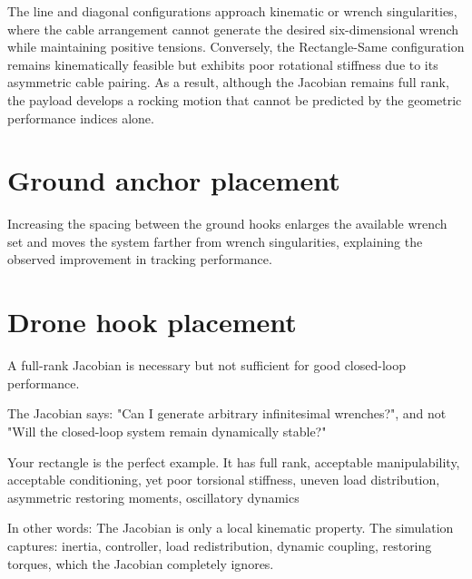 
The line and diagonal configurations approach kinematic or wrench singularities, where the cable arrangement cannot generate the desired six-dimensional wrench while maintaining positive tensions. Conversely, the Rectangle-Same configuration remains kinematically feasible but exhibits poor rotational stiffness due to its asymmetric cable pairing. As a result, although the Jacobian remains full rank, the payload develops a rocking motion that cannot be predicted by the geometric performance indices alone.





\section{Ground anchor placement}
Increasing the spacing between the ground hooks enlarges the available wrench set and moves the system farther from wrench singularities, explaining the observed improvement in tracking performance.

\section{Drone hook placement}
\label{sec:dronehook}



A full-rank Jacobian is necessary but not sufficient for good closed-loop performance.

The Jacobian says: "Can I generate arbitrary infinitesimal wrenches?", and not "Will the closed-loop system remain dynamically stable?"

Your rectangle is the perfect example. It has full rank, acceptable manipulability, acceptable conditioning, yet poor torsional stiffness, uneven load distribution, asymmetric restoring moments, oscillatory dynamics

In other words: The Jacobian is only a local kinematic property. The simulation captures: inertia, controller, load redistribution, dynamic coupling, restoring torques, which the Jacobian completely ignores.